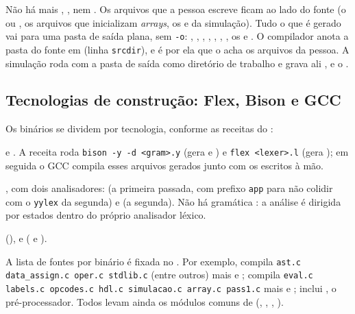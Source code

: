Não há mais , ,  nem
. Os arquivos que a pessoa escreve ficam ao lado do fonte (o
 ou , os arquivos que inicializam \emph{arrays}, os
 e  da simulação). Tudo o que é gerado vai
para uma pasta de saída plana,  sem \lstinline|-o|:
, , ,
, , ,
, os  e . O compilador anota a pasta
do fonte em  (linha \lstinline|srcdir|), e é por ela que o
 acha os arquivos da pessoa. A simulação roda com a pasta de saída
como diretório de trabalho e grava ali ,  e
o .

\subsection{Tecnologias de construção: Flex, Bison e GCC}
\label{sec:yanc-flexbison}

Os binários se dividem por tecnologia, conforme as receitas do :

\begin{description}[leftmargin=1.2em]
  \item[Flex + Bison]  e . A receita roda
    \lstinline|bison -y -d <gram>.y| (gera  e ) e
    \lstinline|flex <lexer>.l| (gera ); em seguida o GCC compila
    esses arquivos gerados junto com os  escritos à mão.
  \item[Apenas Flex] , com dois analisadores:  (a
    primeira passada, com prefixo \lstinline|app| para não colidir com o
    \lstinline|yylex| da segunda) e  (a segunda). Não há gramática
    : a análise é dirigida por estados dentro do próprio analisador léxico.
  \item[Apenas GCC]  (), 
    e  ( e ).
\end{description}

A lista de fontes por binário é fixada no . Por exemplo,
 compila \lstinline|ast.c data_assign.c oper.c stdlib.c| (entre
outros) mais  e ;  compila
\lstinline|eval.c labels.c opcodes.c hdl.c simulacao.c array.c pass1.c| mais
 e ;  inclui , o
pré-processador. Todos levam ainda os módulos comuns de 
(, , , ).

